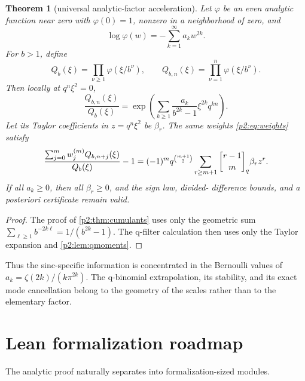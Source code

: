 \documentclass[11pt,oneside]{article}
\numberwithin{equation}{section}
\newtheorem{theorem}{Theorem}[section]
\theoremstyle{definition}
\theoremstyle{remark}
\begin{document}
\begin{theorem}[universal analytic-factor acceleration]
\label{p2:thm:universal}
Let \(\varphi\) be an even analytic function near zero with \(\varphi(0)=1\),
nonzero in a neighborhood of zero, and
\begin{equation}
 \log\varphi(w)=-\sum_{k=1}^{\infty}a_kw^{2k}.
 \label{p2:eq:generalphi}
\end{equation}
For \(b>1\), define
\[
 Q_b(\xi)=\prod_{\nu\geq1}\varphi(\xi/b^\nu),
 \qquad Q_{b,n}(\xi)=\prod_{\nu=1}^n\varphi(\xi/b^\nu).
\]
Then locally at \(q^n\xi^2=0\),
\begin{equation}
 \frac{Q_{b,n}(\xi)}{Q_b(\xi)}
 =\exp\!\left(\sum_{k\geq1}
 \frac{a_k}{b^{2k}-1}\xi^{2k}q^{kn}\right).
 \label{p2:eq:universalTail}
\end{equation}
Let its Taylor coefficients in \(z=q^n\xi^2\) be \(\beta_r\). The same weights
\eqref{p2:eq:weights} satisfy
\begin{equation}
 \frac{\sum_{j=0}^mw_j^{(m)}Q_{b,n+j}(\xi)}{Q_b(\xi)}-1
 =(-1)^mq^{\binom{m+1}{2}}
 \sum_{r\geq m+1}\qbinomPartx{r-1}{m}\beta_r z^r.
 \label{p2:eq:universalError}
\end{equation}
If all \(a_k\geq0\), then all \(\beta_r\geq0\), and the sign law, divided-
difference bounds, and a posteriori certificate remain valid.
\end{theorem}

\begin{proof}
The proof of \cref{p2:thm:cumulants} uses only the geometric sum
\(\sum_{\ell\geq1}b^{-2k\ell}=1/(b^{2k}-1)\). The q-filter calculation then
uses only the Taylor expansion and \cref{p2:lem:qmoments}.
\end{proof}

Thus the sinc-specific information is concentrated in the Bernoulli values of
\(a_k=\zeta(2k)/(k\pi^{2k})\). The q-binomial extrapolation, its stability, and
its exact mode cancellation belong to the geometry of the scales rather than to
the elementary factor.

\section{Lean formalization roadmap}
\label{p2:sec:lean}

The analytic proof naturally separates into formalization-sized modules.
\end{document}
